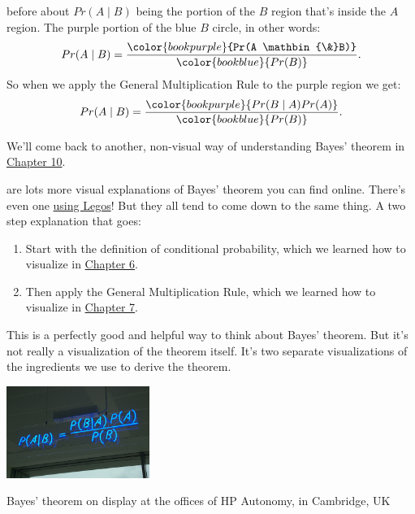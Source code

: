 \documentclass[justified]{tufte-book}
\providecommand{\tightlist}{%
  \setlength{\itemsep}{0pt}\setlength{\parskip}{0pt}}
\newcommand{\given}{\mid}
\renewcommand{\wedge}{\mathbin{\&}}
\newcommand{\p}{Pr}
\theoremstyle{definition}
\theoremstyle{definition}
\theoremstyle{definition}
\theoremstyle{remark}
\begin{document}
 before about \(\p(A \given B)\) being the portion of the \(B\) region that's inside the \(A\) region. The purple portion of the blue \(B\) circle, in other words:
\[
  \begin{aligned}
    \p(A \given B) &= \frac{ \color{bookpurple}{\p(A \wedge B)} }{ \color{bookblue}{\p(B)} }.\\
  \end{aligned}
\]
So when we apply the General Multiplication Rule to the purple region we get:
\[
  \begin{aligned}
    \p(A \given B) &= \frac{ \color{bookpurple}{\p(B \given A)\p(A)} }{ \color{bookblue}{\p(B)} }.\\
  \end{aligned}
\]

We'll come back to another, non-visual way of understanding Bayes' theorem in \protect\hyperlink{bayesibe}{Chapter 10}.

 are lots more visual explanations of Bayes' theorem you can find online. There's even one \href{https://www.countbayesie.com/blog/2015/2/18/bayes-theorem-with-lego}{using Legos}! But they all tend to come down to the same thing. A two step explanation that goes:

\begin{enumerate}
\def\labelenumi{\arabic{enumi}.}
\tightlist
\item
  Start with the definition of conditional probability, which we learned how to visualize in \protect\hyperlink{calculating-conditional-probability}{Chapter 6}.
\item
  Then apply the General Multiplication Rule, which we learned how to visualize in \protect\hyperlink{the-general-multiplication-rule}{Chapter 7}.
\end{enumerate}

This is a perfectly good and helpful way to think about Bayes' theorem. But it's not really a visualization of the theorem itself. It's two separate visualizations of the ingredients we use to derive the theorem.

\begin{marginfigure}
\includegraphics[width=1.83in]{img/neon_bayes} \caption[Bayes' theorem on display at the offices of HP Autonomy, in Cambridge, UK]{Bayes' theorem on display at the offices of HP Autonomy, in Cambridge, UK}\label{fig:neonbayes}
\end{marginfigure}
\end{document}
